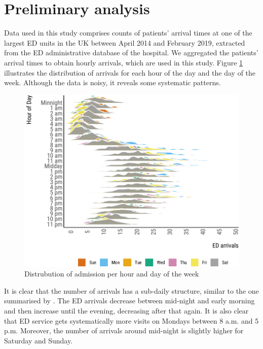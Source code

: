 \documentclass[]{elsarticle} %
\begin{document}
\hypertarget{data}{%
\section{Preliminary analysis}\label{data}}

Data used in this study comprises counts of patients' arrival times at one of the largest ED units in the UK between April 2014 and February 2019, extracted from the ED administrative database of the hospital. We aggregated the patients' arrival times to obtain hourly arrivals, which are used in this study. Figure \ref{fig:hourly-plot-ridge} illustrates the distribution of arrivals for each hour of the day and the day of the week. Although the data is noisy, it reveals some systematic patterns.

\begin{figure}[H]

{\centering \includegraphics{paper_files/figure-latex/hourly-plot-ridge-1} 

}

\caption{Distrubution of admission per hour and day of the week}\label{fig:hourly-plot-ridge}
\end{figure}

It is clear that the number of arrivals has a sub-daily structure, similar to the one summarised by \citet{hertzum2017forecasting}. The ED arrivals decrease between mid-night and early morning and then increase until the evening, decreasing after that again. It is also clear that ED service gets systematically more visits on Mondays between 8 a.m. and 5 p.m. Moreover, the number of arrivals around mid-night is slightly higher for Saturday and Sunday.
\end{document}
